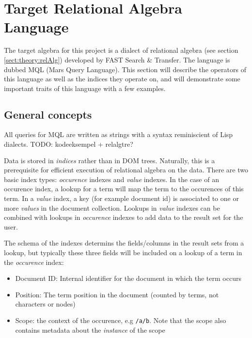 \section{Target Relational Algebra Language}
The target algebra for this project is a dialect of relational algebra (see
section \ref{sect:theory:relAlg}) developed by FAST Search \& Transfer. The
language is dubbed MQL (Mars Query Language). This section will describe the
operators of this language as well as the indices they operate on, and will
demonstrate some important traits of this language with a few examples. 

\subsection{General concepts}
All queries for MQL are written as strings with a syntax reminiscient of Lisp
dialects. TODO: kodeeksempel + relalgtre?

Data is stored in \textit{indices} rather than in
DOM trees. Naturally, this is a prerequisite for efficient execution of relational algebra on the data. There
are two basic index types: \textit{occurence} indexes and \textit{value}
indexes. In the case of an occurence index, a lookup for a term will map the
term to the occurences of this term. In a \textit{value} index, a key (for
example document id) is associated to one or more \textit{values} in the
document collection. Lookups in \textit{value} indexes can be combined with
lookups in \textit{occurence} indexes to add data to the result set for the
user.

The schema of the indexes determins the fields/columns in the result sets from
a lookup, but typically these three fields will be included on a lookup of a
term in the \textit{occurence} index:
\begin{itemize}
  \item Document ID: Internal identifier for the document in which the term
  occurs
  \item Position: The term position in the document (counted by terms, not
  characters or nodes)
  \item Scope: the context of the occurence, e.g \texttt{/a/b}. Note that the
  scope also contains metadata about the \textit{instance} of the scope
\end{itemize}

